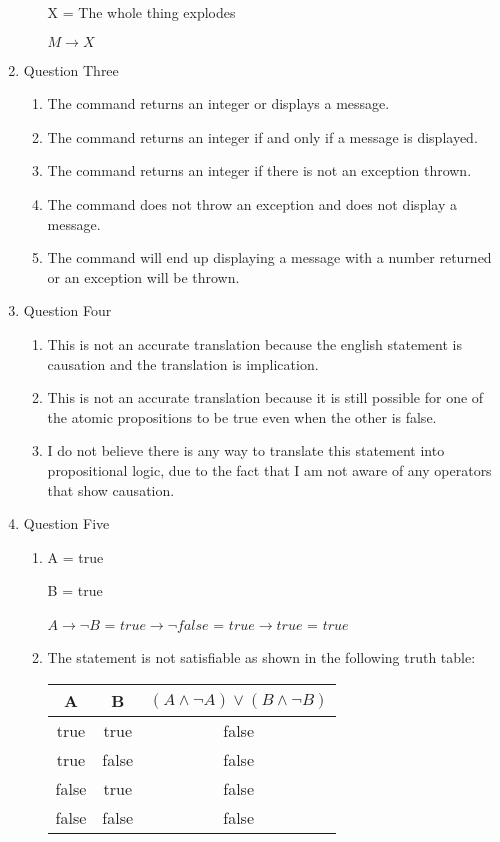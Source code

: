 \documentclass{article}
\begin{document}
\begin{enumerate}
\begin{enumerate}
        X = The whole thing explodes

        $M \rightarrow X$
    \end{enumerate}
    \item Question Three
    \begin{enumerate}
        \item The command returns an integer or displays a message.
        \item The command returns an integer if and only if a message is displayed.
        \item The command returns an integer if there is not an exception thrown.
        \item The command does not throw an exception and does not display a message.
        \item The command will end up displaying a message with a number returned or an exception will be thrown.
    \end{enumerate}
    \item Question Four
    \begin{enumerate}
        \item This is not an accurate translation because the english statement is causation and the translation is implication.
        \item This is not an accurate translation because it is still possible for one of the atomic propositions to be true even when the other is false.
        \item I do not believe there is any way to translate this statement into propositional logic, due to the fact that I am not aware of any operators that show causation.
    \end{enumerate}
    \item Question Five
    \begin{enumerate}
        \item
        A = true

        B = true

        $A \rightarrow \neg B$ = $true \rightarrow \neg false$ = $true \rightarrow true$ = $true$

        \item
        The statement is not satisfiable as shown in the following truth table:

        \begin{tabular}{| c | c | c |}
            \hline
            A & B & $(A \land \neg A) \lor (B \land \neg B)$ \\
            \hline
            true & true & false \\
            \hline
            true & false & false \\
            \hline
            false & true & false \\
            \hline
            false & false & false \\
            \hline
        \end{tabular}


\end{enumerate}
\end{enumerate}
\end{document}
